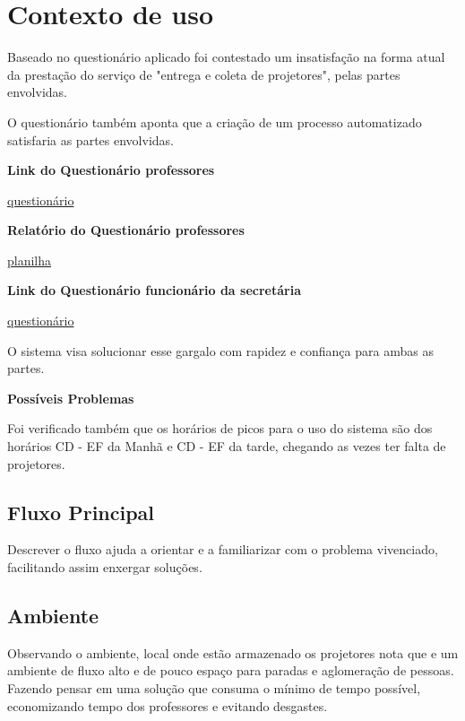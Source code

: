 \section{Contexto de uso}
\hspace{2.0cm}

Baseado no questionário aplicado foi contestado um insatisfação na forma atual
da prestação do serviço de "entrega e coleta de projetores", pelas partes
envolvidas. 

O questionário também aponta que a criação de um processo automatizado
satisfaria as partes envolvidas. 

\begin{center}
  \textbf{Link do Questionário professores}
  
  \href{https://goo.gl/forms/FzfGAn2JHJQKLoEq1}{questionário}

  \textbf{Relatório do Questionário professores}
  
  \href{https://goo.gl/S1c97v}{planilha}

  \textbf{Link do Questionário funcionário da secretária}

  \href{https://goo.gl/forms/FzfGAn2JHJQKLoEq1}{questionário}

\end{center}


O sistema visa solucionar esse gargalo com rapidez e confiança para ambas as
partes. 


\textbf{Possíveis Problemas}

Foi verificado também que os horários de picos para o uso do sistema são dos
horários CD - EF da Manhã e CD - EF da tarde, chegando as vezes ter falta de 
projetores. 


\subsection{Fluxo Principal}


Descrever o fluxo ajuda a orientar e a familiarizar com o problema vivenciado,
facilitando assim enxergar soluções.


\subsection{Ambiente}


Observando o ambiente, local onde estão armazenado os projetores nota que e um
ambiente de fluxo alto e de pouco espaço para paradas e aglomeração de pessoas.
Fazendo pensar em uma solução que consuma o mínimo de tempo possível,
economizando tempo dos professores e evitando desgastes. 


